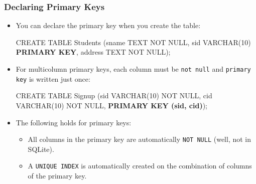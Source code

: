 \documentclass[dvipsnames]{beamer}
\begin{document}
\begin{frame}[fragile=singleslide]
  \frametitle{Declaring Primary Keys}
  \begin{itemize}
  \item You can declare the primary key when you create the table:
\begin{footnotesize}
\begin{semiverbatim}
  CREATE TABLE Students (sname TEXT NOT NULL,
                         sid VARCHAR(10) \textbf{PRIMARY KEY}, 
                         address TEXT NOT NULL);
\end{semiverbatim}
\end{footnotesize}

\item For multicolumn primary keys, each column
  must be \texttt{not null} and \texttt{primary key} is written just once:
\begin{footnotesize}
\begin{semiverbatim}
  CREATE TABLE Signup (sid VARCHAR(10) NOT NULL, 
                       cid VARCHAR(10) NOT NULL,
                       \textbf{PRIMARY KEY (sid, cid)});
\end{semiverbatim}
\end{footnotesize}

\item The following holds for primary keys:
\begin{itemize}
\item All columns in the primary key are automatically \texttt{NOT
    NULL} (well, not in SQLite).
\item A \texttt{UNIQUE INDEX} is automatically created on the
  combination of columns of the primary key.
\end{itemize}

  \end{itemize}
\end{frame}





\end{document}
